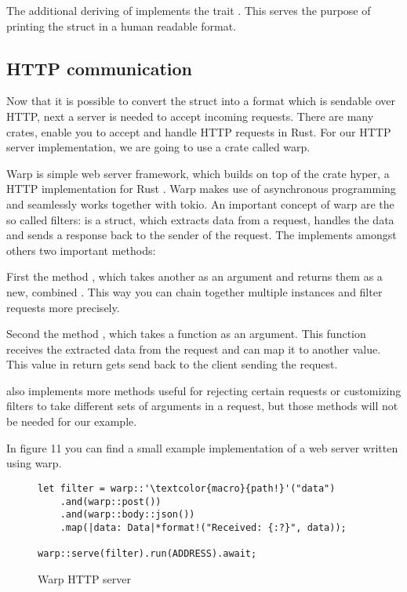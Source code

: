 The additional deriving of  implements the trait . This serves the purpose of
printing the struct in a human readable format.

\subsection{HTTP communication}
Now that it is possible to convert the struct into a format which is sendable over HTTP, next a server is needed to
accept incoming requests. There are many crates, enable you to accept and handle HTTP requests in Rust. For our HTTP
server implementation, we are going to use a crate called warp.

Warp is simple web server framework, which builds on top of the crate hyper, a HTTP implementation for Rust
\cite{warp-doc}. Warp makes use of asynchronous programming and seamlessly works together with tokio. An important
concept of warp are the so called filters:  is a struct, which extracts data from a request, handles
the data and sends a response back to the sender of the request. The  implements amongst others two
important methods:

First the method , which takes another  as an argument and returns
them as a new, combined . This way you can chain together multiple  instances and filter
requests more precisely.

Second the method , which takes a function as an argument. This function receives the extracted data from the
request and can map it to another value. This value in return gets send back to the client sending the request.

 also implements more methods useful for rejecting certain requests or customizing filters to take
different sets of arguments in a request, but those methods will not be needed for our example.

In figure 11 you can find a small example implementation of a web server written using warp.

\begin{figure}[ht]
    \begin{verbatim}
let filter = warp::'\textcolor{macro}{path!}'("data")
    .and(warp::post())
    .and(warp::body::json())
    .map(|data: Data|*format!("Received: {:?}", data));

warp::serve(filter).run(ADDRESS).await;
    \end{verbatim}
    \caption{Warp HTTP server}
\end{figure}

